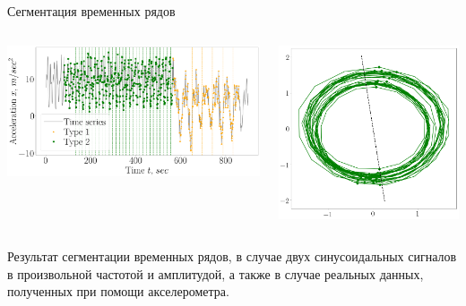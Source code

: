 \documentclass[10pt,pdf,hyperref={unicode}]{beamer}
\begin{document}
\begin{frame}[shrink=5]{Сегментация временных рядов}
\begin{columns}
    \begin{column}{0.5\textwidth}
        \includegraphics[width=1\textwidth]{results/real_2_segmentation_vector}
    \end{column}
    \begin{column}{0.3\textwidth}
        \includegraphics[width=1\textwidth]{results/real_2_phase_space1}
    \end{column}
\end{columns}

Результат сегментации временных рядов, в случае двух синусоидальных сигналов в произвольной частотой и амплитудой, а также в случае реальных данных, полученных при помощи акселерометра.

\end{frame}
\end{document}
